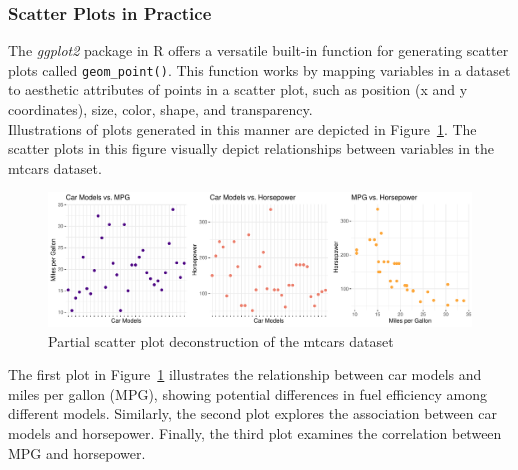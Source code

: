 \documentclass{article}\usepackage[]{graphicx}\usepackage[]{xcolor}
\makeatletter
\def\maxwidth{ %
  \ifdim\Gin@nat@width>\linewidth
    \linewidth
  \else
    \Gin@nat@width
  \fi
}
\newenvironment{knitrout}{}{} %
\numberwithin{equation}{section}
\makeatother
\begin{document}
\subsubsection{Scatter Plots in Practice}

\noindent The \textit{ggplot2} package in R offers a versatile built-in function for generating scatter plots called \texttt{geom\_point()}. This function works by mapping variables in a dataset to aesthetic attributes of points in a scatter plot, such as position (x and y coordinates), size, color, shape, and transparency.\\

\noindent Illustrations of plots generated in this manner are depicted in Figure~\ref{fig:bubble-plot-construction}. The scatter plots in this figure visually depict relationships between variables in the mtcars dataset.\\

\begin{knitrout}\scriptsize
{}\color{fgcolor}\begin{figure}[H]

{\centering \includegraphics[width=\maxwidth]{figure/beamer-bubble-plot-construction-1} 

}

\caption[Partial scatter plot deconstruction of the mtcars dataset]{Partial scatter plot deconstruction of the mtcars dataset}\label{fig:bubble-plot-construction}
\end{figure}

\end{knitrout}

\noindent The first plot in Figure~\ref{fig:bubble-plot-construction} illustrates the relationship between car models and miles per gallon (MPG), showing potential differences in fuel efficiency among different models. Similarly, the second plot explores the association between car models and horsepower. Finally, the third plot examines the correlation between MPG and horsepower. \\
\end{document}

